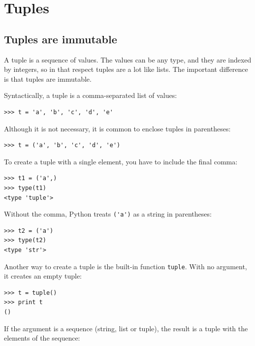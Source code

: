 \documentclass[10pt]{book}
\begin{document}
\chapter{Tuples}
\label{tuplechap}

\section{Tuples are immutable}


A tuple is a sequence of values.  The values can be any type, and
they are indexed by integers, so in that respect tuples are a lot
like lists.  The important difference is that tuples are immutable.


Syntactically, a tuple is a comma-separated list of values:

\beforeverb
\begin{verbatim}
>>> t = 'a', 'b', 'c', 'd', 'e'
\end{verbatim}
\afterverb
%
Although it is not necessary, it is common to enclose tuples in
parentheses:


\beforeverb
\begin{verbatim}
>>> t = ('a', 'b', 'c', 'd', 'e')
\end{verbatim}
\afterverb
%
To create a tuple with a single element, you have to include the final
comma:


\beforeverb
\begin{verbatim}
>>> t1 = ('a',)
>>> type(t1)
<type 'tuple'>
\end{verbatim}
\afterverb
%
Without the comma, Python treats \verb"('a')" as a string in
parentheses:

\beforeverb
\begin{verbatim}
>>> t2 = ('a')
>>> type(t2)
<type 'str'>
\end{verbatim}
\afterverb
%
Another way to create a tuple is the built-in function {\tt tuple}.
With no argument, it creates an empty tuple:


\beforeverb
\begin{verbatim}
>>> t = tuple()
>>> print t
()
\end{verbatim}
\afterverb
%
If the argument is a sequence (string, list or tuple), the result
is a tuple with the elements of the sequence:
\end{document}
